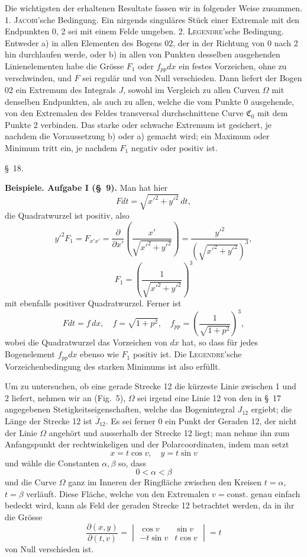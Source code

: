 \documentclass[11pt,a4paper,leqno]{article}
\begin{document}
Die wichtigsten der erhaltenen Resultate fassen wir in folgender Weise zusammen. 1. \textsc{Jacobi}'sche Bedingung. Ein nirgends singuläres Stück einer Extremale mit den Endpunkten 0, 2 sei mit einem Felde umgeben. 2. \textsc{Legendre}'sche Bedingung. Entweder a) in allen Elementen des Bogens 02, der in der Richtung von 0 nach 2 hin durchlaufen werde, oder b) in allen von Punkten desselben ausgehenden Linienelementen habe die Grösse $F_1$ oder $f_{pp}dx$ ein festes Vorzeichen, ohne zu verschwinden, und $F$ sei regulär und von Null verschieden. Dann liefert der Bogen 02 ein Extremum des Integrals $J$, sowohl im Vergleich zu allen Curven $\Omega$ mit denselben Endpunkten, als auch zu allen, welche die vom Punkte 0 ausgehende, von den Extremalen des Feldes transversal durchschnittene Curve $\mathfrak{C}_0$ mit dem Punkte 2 verbinden. Das starke oder schwache Extremum ist gesichert, je nachdem die Voraussetzung b) oder a) gemacht wird; ein Maximum oder Minimum tritt ein, je nachdem $F_1$ negativ oder positiv ist.

\begin{center}{\large \S~18.}\end{center}

\noindent\textbf{Beispiele. Aufgabe I (\S~9).} Man hat hier
\[
Fdt=\sqrt{x'^2+y'^2}\,dt,
\]
die Quadratwurzel ist positiv, also
\[
y'^2F_1=F_{x'x'}=\frac{\partial}{\partial x'}
\left(\frac{x'}{\sqrt{x'^2+y'^2}}\right)
=\frac{y'^2}{\left(\sqrt{x'^2+y'^2}\right)^3},
\]
\[
F_1=\left(\frac{1}{\sqrt{x'^2+y'^2}}\right)^3
\]
mit ebenfalls positiver Quadratwurzel. Ferner ist
\[
Fdt=f\,dx,\quad f=\sqrt{1+p^2},\quad
f_{pp}=\left(\frac{1}{\sqrt{1+p^2}}\right)^3,
\]
wobei die Quadratwurzel das Vorzeichen von $dx$ hat, so dass für jedes Bogenelement $f_{pp}dx$ ebenso wie $F_1$ positiv ist. Die \textsc{Legendre}'sche Vorzeichenbedingung des starken Minimums ist also erfüllt.

Um zu untersuchen, ob eine gerade Strecke 12 die kürzeste Linie zwischen 1 und 2 liefert, nehmen wir an (Fig.~5), $\Omega$ sei irgend eine Linie 12 von den in \S~17 angegebenen Stetigkeitseigenschaften, welche das Bogenintegral $J_{12}$ ergiebt; die Länge
der Strecke 12 ist $\overline{J}_{12}$. Es sei ferner 0 ein Punkt der Geraden 12, der nicht der Linie $\Omega$ angehört und ausserhalb der Strecke 12 liegt; man nehme ihn zum Anfangspunkt der rechtwinkeligen und der Polarcoordinaten, indem man setzt
\[
x=t\cos v,\quad y=t\sin v
\]
und wähle die Constanten $\alpha,\beta$ so, dass
\[
0<\alpha<\beta
\]
und die Curve $\Omega$ ganz im Inneren der Ringfläche zwischen den Kreisen $t=\alpha$, $t=\beta$ verläuft. Diese Fläche, welche von den Extremalen $v=\text{const.}$ genau einfach bedeckt wird, kann als Feld der geraden Strecke 12 betrachtet werden, da in ihr die Grösse
\[
\frac{\partial(x,y)}{\partial(t,v)}
=
\begin{vmatrix}
\cos v & \sin v\\
-t\sin v & t\cos v
\end{vmatrix}
=t
\]
von Null verschieden ist.
\end{document}
